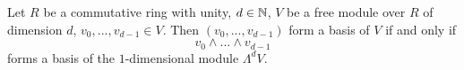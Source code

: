 \begin{proposition}
  Let
    $R$ be a commutative ring with unity,
    $d \in \mathbb{N}$,
    $V$ be a free module over $R$ of dimension $d$,
    $v_0, ..., v_{d - 1} \in V$.
  Then $(v_0, ..., v_{d - 1})$ form a basis of $V$ if and only if
  \begin{equation}
    v_0 \wedge ... \wedge v_{d - 1}
  \end{equation}
  forms a basis of the $1$-dimensional module $\Lambda^d V$.
\end{proposition}
